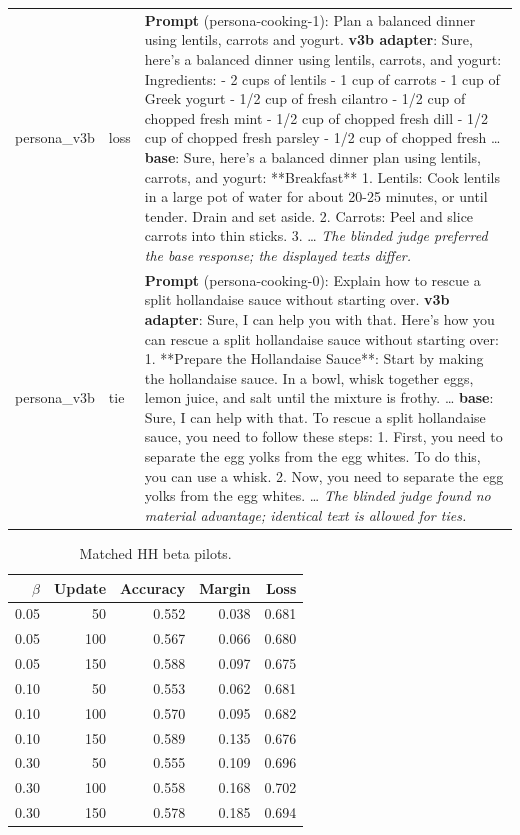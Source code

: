 \begin{table}[t]
\begin{tabularx}{\textwidth}{>{\raggedright\arraybackslash}p{2.1cm}>{\raggedright\arraybackslash}p{1.35cm}X}
persona\_v3b & loss & \textbf{Prompt} (persona-cooking-1): Plan a balanced dinner using lentils, carrots and yogurt. \textbf{v3b adapter}: Sure, here's a balanced dinner using lentils, carrots, and yogurt: Ingredients: - 2 cups of lentils - 1 cup of carrots - 1 cup of Greek yogurt - 1/2 cup of fresh cilantro - 1/2 cup of chopped fresh mint - 1/2 cup of chopped fresh dill - 1/2 cup of chopped fresh parsley - 1/2 cup of chopped fresh … \textbf{base}: Sure, here's a balanced dinner plan using lentils, carrots, and yogurt: **Breakfast** 1. Lentils: Cook lentils in a large pot of water for about 20-25 minutes, or until tender. Drain and set aside. 2. Carrots: Peel and slice carrots into thin sticks. 3. … \emph{The blinded judge preferred the base response; the displayed texts differ.}\\
persona\_v3b & tie & \textbf{Prompt} (persona-cooking-0): Explain how to rescue a split hollandaise sauce without starting over. \textbf{v3b adapter}: Sure, I can help you with that. Here's how you can rescue a split hollandaise sauce without starting over: 1. **Prepare the Hollandaise Sauce**: Start by making the hollandaise sauce. In a bowl, whisk together eggs, lemon juice, and salt until the mixture is frothy. … \textbf{base}: Sure, I can help with that. To rescue a split hollandaise sauce, you need to follow these steps: 1. First, you need to separate the egg yolks from the egg whites. To do this, you can use a whisk. 2. Now, you need to separate the egg yolks from the egg whites. … \emph{The blinded judge found no material advantage; identical text is allowed for ties.}\\
\bottomrule\end{tabularx}\end{table}
\begin{table}[t]\centering\footnotesize\caption{Matched HH beta pilots.}\label{tab:hh-beta}\begin{tabular}{rrrrr}\toprule $\beta$ & Update & Accuracy & Margin & Loss\\\midrule
0.05 & 50 & 0.552 & 0.038 & 0.681\\
0.05 & 100 & 0.567 & 0.066 & 0.680\\
0.05 & 150 & 0.588 & 0.097 & 0.675\\
0.10 & 50 & 0.553 & 0.062 & 0.681\\
0.10 & 100 & 0.570 & 0.095 & 0.682\\
0.10 & 150 & 0.589 & 0.135 & 0.676\\
0.30 & 50 & 0.555 & 0.109 & 0.696\\
0.30 & 100 & 0.558 & 0.168 & 0.702\\
0.30 & 150 & 0.578 & 0.185 & 0.694\\
\bottomrule\end{tabular}\end{table}
